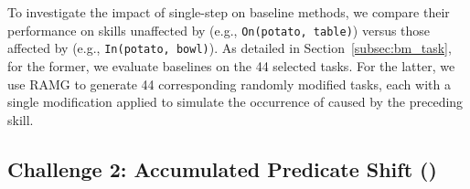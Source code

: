 To investigate the impact of single-step \pb on baseline methods, we compare their performance on skills unaffected by \pb (e.g., \texttt{On(potato, table)}) versus those affected by \pb (e.g., \texttt{In(potato, bowl)}). As detailed in Section~\ref{subsec:bm_task}, for the former, we evaluate baselines on the 44 selected tasks. For the latter, we use RAMG to generate 44 corresponding randomly modified tasks, each with a single modification applied to simulate the occurrence of \pb caused by the preceding skill. 









\subsection{Challenge 2: Accumulated Predicate Shift (\bmb)}
\label{subsec:bm_2}

